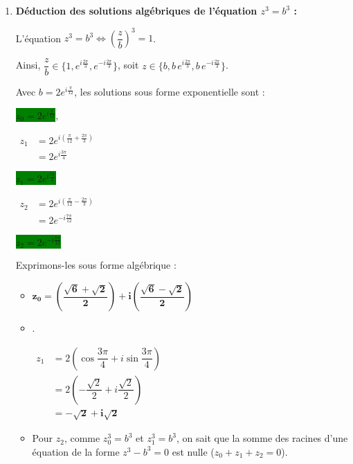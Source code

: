 \documentclass[12pt,a4paper]{article}
\begin{document}
\begin{enumerate}
\begin{enumerate}
        \item \textbf{Déduction des solutions algébriques de l'équation $z^3 = b^3$ :}
        
        L'équation $z^3 = b^3 \iff \left(\dfrac{z}{b}\right)^3 = 1$. 
        
        Ainsi, $\dfrac{z}{b} \in \{1, e^{i\frac{2\pi}{3}}, e^{-i\frac{2\pi}{3}}\}$, soit $z \in \{b, b\,e^{i\frac{2\pi}{3}}, b\,e^{-i\frac{2\pi}{3}}\}$.
        
        Avec $b = 2e^{i\frac{\pi}{12}}$, les solutions sous forme exponentielle sont :
        
        \colorbox{green}{$z_0 = 2e^{i\frac{\pi}{12}}$},
        
        $\begin{aligned}
        z_1 &= 2e^{i\left(\frac{\pi}{12} + \frac{2\pi}{3}\right)}\\
        &= 2e^{i\frac{3\pi}{4}}
        \end{aligned}$
        
        \colorbox{green}{$z_1= 2e^{i\frac{3\pi}{4}}$}
        
         $\begin{aligned}
        z_2 &= 2e^{i\left(\frac{\pi}{12} - \frac{2\pi}{3}\right)}\\
        &= 2e^{-i\frac{7\pi}{12}}
        \end{aligned}$
        
        \colorbox{green}{$z_2= 2e^{-i\frac{7\pi}{12}}$}
        
        Exprimons-les sous forme algébrique :
        \begin{itemize}
            \item $\mathbf{z_0 = \left(\dfrac{\sqrt{6}+\sqrt{2}}{2}\right) + i \left(\dfrac{\sqrt{6}-\sqrt{2}}{2}\right)}$
            \item.
            
            $
            \begin{aligned}
            z_1 &= 2\left(\cos\dfrac{3\pi}{4} + i\sin\dfrac{3\pi}{4}\right)\\
                &= 2\left(-\dfrac{\sqrt{2}}{2} + i\dfrac{\sqrt{2}}{2}\right) \\
                &= \mathbf{-\sqrt{2} + i\sqrt{2}}
            \end{aligned}
            $
            \item Pour $z_2$, comme $z_0^3 = b^3$ et $z_1^3 = b^3$, on sait que la somme des racines d'une équation de la forme $z^3 - b^3 = 0$ est nulle ($z_0 + z_1 + z_2 = 0$). 
            

\end{itemize}
\end{enumerate}
\end{enumerate}
\end{document}
